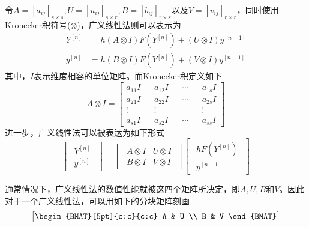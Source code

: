 令$A=[a_{ij}]_{s\times s},U=[u_{ij}]_{s\times r},B=[b_{ij}]_{r\times s}$以及$V=[v_{ij}]_{r\times r}$，同时使用Kronecker积符号($\otimes$)，广义线性法则可以表示为
\begin{align}
Y^{[n]}&=h(A\otimes I)F(Y^{[n]})+(U\otimes I)y^{[n-1]}\\
y^{[n]}&=h(B\otimes I)F(Y^{[n]})+(V\otimes I)y^{[n-1]}
\end{align}
其中，$I$表示维度相容的单位矩阵。而Kronecker积定义如下
\begin{equation}
A\otimes I=\begin{bmatrix}
a_{11} I&&a_{12}I&&\cdots && a_{1s} I\\
a_{21}I&&a_{22}I&&\cdots && a_{2s}I\\
\vdots &&\vdots && &&\vdots\\
a_{s1}I &&a_{s2}I&&\cdots &&a_{ss}I
\end{bmatrix}
\end{equation}
进一步，广义线性法可以被表达为如下形式
\begin{equation}
\begin{bmatrix}
\begin{array}{c}
Y^{[n]}\\ \hline
y^{[n]}
\end{array}
\end{bmatrix}=\begin{bmatrix}
\begin{array}{c|c}
A\otimes I & U\otimes I \\ \hline
B\otimes I & V\otimes I
\end{array}
\end{bmatrix}\begin{bmatrix}
\begin{array}{c}
hF(Y^{[n]})\\ \hline
y^{[n-1]}
\end{array}
\end{bmatrix}
\end{equation}

通常情况下，广义线性法的数值性能就被这四个矩阵所决定，即$A,U,B$和$V$。因此对于一个广义线性法，可以用如下的分块矩阵刻画
\begin{equation}
\begin{bmatrix}
\begin{BMAT}[5pt]{c:c}{c:c}
	A & U \\
	B & V
\end{BMAT}
\end{bmatrix}
\end{equation}

